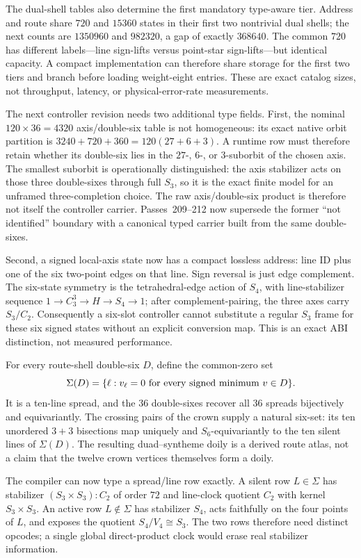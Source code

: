 \documentclass[11pt]{article}
\begin{document}
The dual-shell tables also determine the first mandatory type-aware tier.  Address and route share
$720$ and $15360$ states in their first two nontrivial dual shells; the next counts are $1350960$ and
$982320$, a gap of exactly $368640$.  The common $720$ has different labels---line sign-lifts versus
point-star sign-lifts---but identical capacity.  A compact implementation can therefore share storage for
the first two tiers and branch before loading weight-eight entries.  These are exact catalog sizes, not
throughput, latency, or physical-error-rate measurements.

The next controller revision needs two additional type fields.  First, the nominal
$120\times36=4320$ axis/double-six table is not homogeneous: its exact native orbit partition is
$3240+720+360=120(27+6+3)$.  A runtime row must therefore retain whether its double-six lies in the
$27$-, $6$-, or $3$-suborbit of the chosen axis.  The smallest suborbit is operationally distinguished:
the axis stabilizer acts on those three double-sixes through full $S_3$, so it is the exact finite model
for an unframed three-completion choice.  The raw axis/double-six product is therefore not itself the
controller carrier.  Passes~209--212 now supersede the former ``not identified'' boundary with a
canonical typed carrier built from the same double-sixes.

Second, a signed local-axis state now has a compact lossless address: line ID plus one of the six
two-point edges on that line.  Sign reversal is just edge complement.  The six-state symmetry is the
tetrahedral-edge action of $S_4$, with line-stabilizer sequence
$1\to C_3^3\to H\to S_4\to1$; after complement-pairing, the three axes carry $S_3/C_2$.  Consequently a
six-slot controller cannot substitute a regular $S_3$ frame for these six signed states without an
explicit conversion map.  This is an exact ABI distinction, not measured performance.

For every route-shell double-six $D$, define the common-zero set
\[
 \Sigma(D)=\{\ell:v_\ell=0\ \hbox{for every signed minimum }v\in D\}.
\]
It is a ten-line spread, and the $36$ double-sixes recover all $36$ spreads bijectively and
equivariantly.  The crossing pairs of the crown supply a natural six-set: its ten unordered $3+3$
bisections map uniquely and $S_6$-equivariantly to the ten silent lines of $\Sigma(D)$.  The resulting
duad--syntheme doily is a derived route atlas, not a claim that the twelve crown vertices themselves
form a doily.

The compiler can now type a spread/line row exactly.  A silent row $L\in\Sigma$ has stabilizer
$(S_3\times S_3){:}C_2$ of order $72$ and line-clock quotient $C_2$ with kernel $S_3\times S_3$.  An
active row $L\notin\Sigma$ has stabilizer $S_4$, acts faithfully on the four points of $L$, and exposes
the quotient $S_4/V_4\cong S_3$.  The two rows therefore need distinct opcodes; a single global
direct-product clock would erase real stabilizer information.
\end{document}
